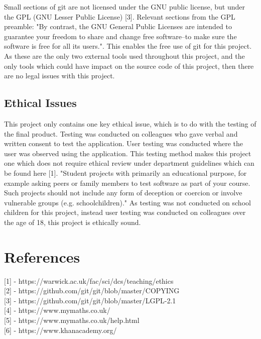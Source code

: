 \documentclass{article}
\begin{document}
Small sections of git are not licensed under the GNU public license, but under the GPL (GNU Lesser Public License) [3]. Relevant sections from the GPL preamble: "By contrast, the GNU General Public Licenses are intended to guarantee your freedom to share and change free software--to make sure the software is free for all its users.". This enables the free use of git for this project. \\

As these are the only two external tools used throughout this project, and the only tools which could have impact on the source code of this project, then there are no legal issues with this project.

\subsection{Ethical Issues}

This project only contains one key ethical issue, which is to do with the testing of the final product. Testing was conducted on colleagues who gave verbal and written consent to test the application. User testing was conducted where the user was observed using the application. This testing method makes this project one which does not require ethical review under department guidelines which can be found here [1]. "Student projects with primarily an educational purpose, for example asking peers or family members to test software as part of your course. Such projects should not include any form of deception or coercion or involve vulnerable groups (e.g. schoolchildren)." As testing was not conducted on school children for this project, instead user testing was conducted on colleagues over the age of 18, this project is ethically sound. 

\section{References}

[1] - https://warwick.ac.uk/fac/sci/dcs/teaching/ethics \\

[2] - https://github.com/git/git/blob/master/COPYING \\

[3] - https://github.com/git/git/blob/master/LGPL-2.1 \\

[4] - https://www.mymaths.co.uk/ \\

[5] - https://www.mymaths.co.uk/help.html \\

[6] - https://www.khanacademy.org/
\end{document}
